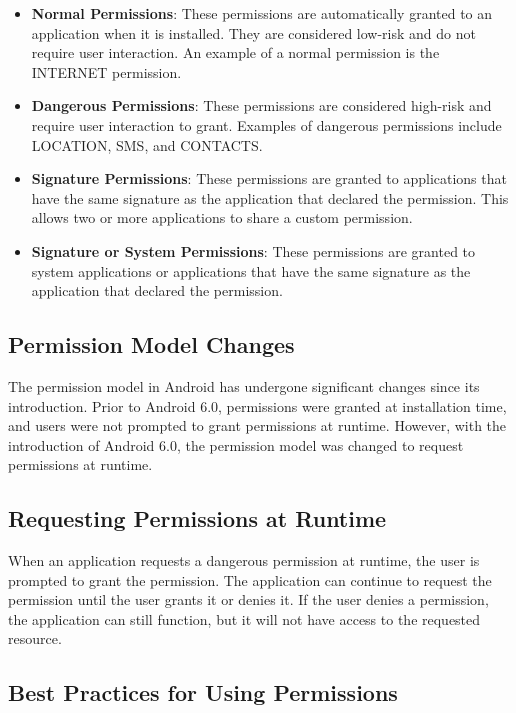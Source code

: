 \documentclass{article}
\begin{document}
\begin{itemize}
\item \textbf{Normal Permissions}: These permissions are automatically granted to an application when it is installed. They are considered low-risk and do not require user interaction. An example of a normal permission is the INTERNET permission.
\item \textbf{Dangerous Permissions}: These permissions are considered high-risk and require user interaction to grant. Examples of dangerous permissions include LOCATION, SMS, and CONTACTS.
\item \textbf{Signature Permissions}: These permissions are granted to applications that have the same signature as the application that declared the permission. This allows two or more applications to share a custom permission.
\item \textbf{Signature or System Permissions}: These permissions are granted to system applications or applications that have the same signature as the application that declared the permission.
\end{itemize}

\subsection{Permission Model Changes}

The permission model in Android has undergone significant changes since its introduction. Prior to Android 6.0, permissions were granted at installation time, and users were not prompted to grant permissions at runtime. However, with the introduction of Android 6.0, the permission model was changed to request permissions at runtime.

\subsection{Requesting Permissions at Runtime}

When an application requests a dangerous permission at runtime, the user is prompted to grant the permission. The application can continue to request the permission until the user grants it or denies it. If the user denies a permission, the application can still function, but it will not have access to the requested resource.

\subsection{Best Practices for Using Permissions}
\end{document}
